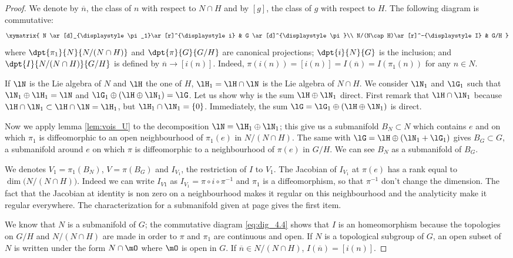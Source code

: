 \begin{proof}
We denote by $\overline{n}$, the class of $n$ with respect to $N\cap H$ and by $[g]$, the class of $g$ with respect to $H$.
The following diagram is commutative:
\begin{equation}\label{eq:dig_4.4}
 \xymatrix{
    N  \ar[d]_{\displaystyle\pi_1}\ar[r]^{\displaystyle i} &  G \ar[d]^{\displaystyle\pi}\\
    N/(N\cap H)\ar[r]^-{\displaystyle I} &       G/H
  }
\end{equation}
where $\dpt{\pi_1}{N}{N/(N\cap H)}$ and $\dpt{\pi}{G}{G/H}$ are canonical projections; $\dpt{i}{N}{G}$ is the inclusion; and $\dpt{I}{N/(N\cap H)}{G/H}$ is defined by $\overline{n}\to [i(n)]$. Indeed, $\pi(i(n))=[i(n)]=I( \overline{n} )=I(\pi_1(n))$ for any $n\in N$.

If $\lN$ is the Lie algebra of $N$ and $\lH$ the one of $H$, $\lH_1=\lH\cap\lN$ is the Lie algebra of $N\cap H$. We consider $\lN_1$ and  $\lG_1$ such that $\lN_1\oplus\lH_1=\lN$ and $\lG_1\oplus(\lH\oplus\lN_1)=\lG$. Let us show why is the sum $\lH\oplus\lN_1$ direct. First remark that $\lH\cap\lN_1$ because $\lH\cap\lN_1\subset\lH\cap\lN=\lH_1$, but $\lH_1\cap\lN_1=\{0\}$. Immediately, the sum $\lG=\lG_1\oplus(\lH\oplus\lN_1)$ is direct.

Now we apply lemma \ref{lem:vois_U} to the decomposition $\lN=\lH_1\oplus\lN_1$; this give us a submanifold $B_N\subset N$ which contains $e$ and on which $\pi_1$ is diffeomorphic to an open neighbourhood of $\pi_1(e)$ in $N/(N\cap H)$. The same with $\lG=\lH\oplus(\lN_1+\lG_1)$ gives $B_G\subset G$, a submanifold around $e$ on which $\pi$ is diffeomorphic to a neighbourhood of $\pi(e)$ in $G/H$. We can see $B_N$ as a submanifold of $B_G$.

We denotes $V_1=\pi_1(B_N)$, $V=\pi(B_G)$ and $I_{V_1}$, the restriction of $I$ to $V_1$. The Jacobian of $I_{V_1}$ at $\pi(e)$ has a rank equal to $\dim\big( N/(N\cap H) \big)$. Indeed we can write $I_{V1}$ as $I_{V_1}=\pi\circ i\circ\pi^{-1}$ and $\pi_1$ is a diffeomorphism, so that $\pi^{-1}$ don't change the dimension. The fact that the Jacobian at identity is non zero on a neighbourhood makes it regular on this neighbourhood and the analyticity make it regular everywhere. The characterization for a submanifold given at page \pageref{pg:caract_subvar} gives the first item.

We know that $N$ is a submanifold of $G$; the commutative diagram \eqref{eq:dig_4.4} shows that $I$ is an homeomorphism because the topologies on $G/H$ and $N/(N\cap H)$ are made in order to $\pi$ and $\pi_1$ are continuous and open. If $N$ is a topological subgroup of $G$, an open subset of $N$ is written under the form $N\cap\mO$ where $\mO$ is open in $G$. If $\overline{n}\in N/(N\cap H)$, $I(\overline{n})=[i(n)]$.


\end{proof}
